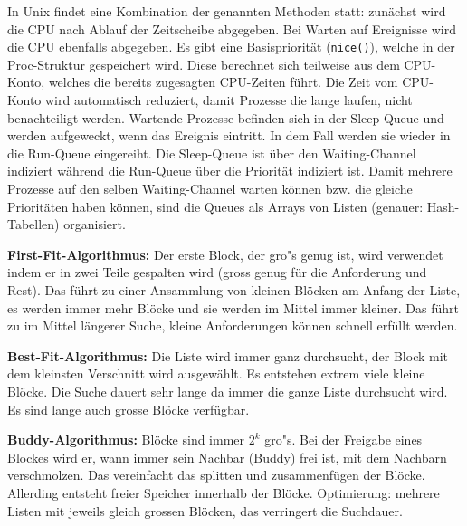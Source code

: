 \begin{answer}
  In Unix findet eine Kombination der genannten Methoden statt: zunächst wird die CPU nach Ablauf der Zeitscheibe abgegeben. Bei Warten auf Ereignisse wird die CPU ebenfalls abgegeben. Es gibt eine Basispriorität (\texttt{nice()}), welche in der Proc-Struktur gespeichert wird.
  Diese berechnet sich teilweise aus dem CPU-Konto, welches die bereits zugesagten CPU-Zeiten führt.
  Die Zeit vom CPU-Konto wird automatisch reduziert, damit Prozesse die lange laufen, nicht benachteiligt werden.
  Wartende Prozesse befinden sich in der Sleep-Queue und werden aufgeweckt, wenn das Ereignis eintritt. In dem Fall werden sie wieder in die Run-Queue eingereiht.
  Die Sleep-Queue ist über den Waiting-Channel indiziert während die Run-Queue über die Priorität indiziert ist.
  Damit mehrere Prozesse auf den selben Waiting-Channel warten können bzw. die gleiche Prioritäten haben können,
  sind die Queues als Arrays von Listen (genauer: Hash-Tabellen) organisiert.
\end{answer}

\begin{answer}
  \textbf{First-Fit-Algorithmus:}
  Der erste Block, der gro"s genug ist, wird verwendet indem er in zwei Teile gespalten wird
  (gross genug für die Anforderung und Rest).
  Das führt zu einer Ansammlung von kleinen Blöcken am Anfang der Liste, es werden immer
  mehr Blöcke und sie werden im Mittel immer kleiner. Das führt zu im Mittel längerer
  Suche, kleine Anforderungen können schnell erfüllt werden.

  \textbf{Best-Fit-Algorithmus:}
  Die Liste wird immer ganz durchsucht, der Block mit dem kleinsten Verschnitt wird ausgewählt.
  Es entstehen extrem viele kleine Blöcke. Die Suche dauert sehr lange da immer die ganze
  Liste durchsucht wird. Es sind lange auch grosse Blöcke verfügbar.

  \textbf{Buddy-Algorithmus:}
  Blöcke sind immer $2^k$ gro"s. Bei der Freigabe eines Blockes wird er, wann immer sein
  Nachbar (Buddy) frei ist, mit dem Nachbarn verschmolzen.
  Das vereinfacht das splitten und zusammenfügen der Blöcke. Allerding entsteht freier Speicher
  innerhalb der Blöcke.
  Optimierung: mehrere Listen mit jeweils gleich grossen Blöcken, das verringert die Suchdauer.
\end{answer}

